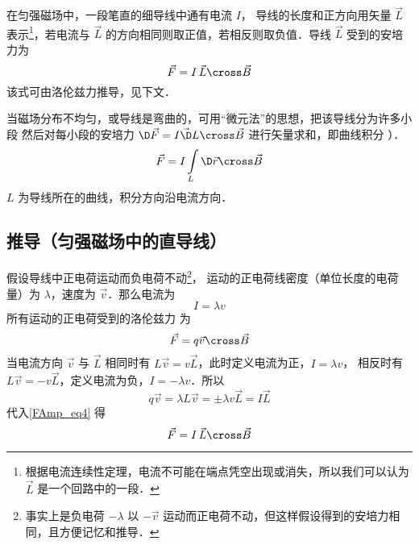 

在匀强磁场中，一段笔直的细导线中通有电流 $I$， 导线的长度和正方向用矢量 $\vec L$ 表示\footnote{根据电流连续性定理，电流不可能在端点凭空出现或消失，所以我们可以认为 $\vec L$ 是一个回路中的一段．}，若电流与 $\vec L$ 的方向相同则取正值，若相反则取负值．导线 $\vec L$ 受到的安培力为
\begin{equation}
\vec F = I\,\vec L \cross \vec B
\end{equation}
该式可由洛伦兹力推导，见下文．

当磁场分布不均匀，或导线是弯曲的，可用“微元法”的思想，把该导线分为许多小段
然后对每小段的安培力 $\D\vec F = I\vec\D L\cross\vec B$ 进行矢量求和，即曲线积分%
）．
\begin{equation}
\vec F = I\int\limits_L {\D \vec r \cross \vec B}
\end{equation}
$L$ 为导线所在的曲线，积分方向沿电流方向．

\subsection{推导（匀强磁场中的直导线）}
假设导线中正电荷运动而负电荷不动\footnote{事实上是负电荷 $-\lambda$ 以 $-\vec v$ 运动而正电荷不动，但这样假设得到的安培力相同，且方便记忆和推导．}， 运动的正电荷线密度（单位长度的电荷量）为 $\lambda$，速度为 $\vec v$．那么电流为%
\begin{equation}
I = \lambda v
\end{equation}
所有运动的正电荷受到的洛伦兹力%
为
\begin{equation}\label{FAmp_eq4}
\vec F =  q\vec v \cross \vec B
\end{equation}
当电流方向 $\vec v$ 与 $\vec L$ 相同时有 $L \vec v = v \vec L$，此时定义电流为正，$I = \lambda v$， 相反时有 $L \vec v = -v\vec L$，定义电流为负，$I = -\lambda v$．所以
\begin{equation}
q\vec v = \lambda L \vec v = \pm \lambda v\vec L= I \vec L
\end{equation}
代入\autoref{FAmp_eq4} 得
\begin{equation}
\vec F = I\,\vec L \cross \vec B
\end{equation}


















